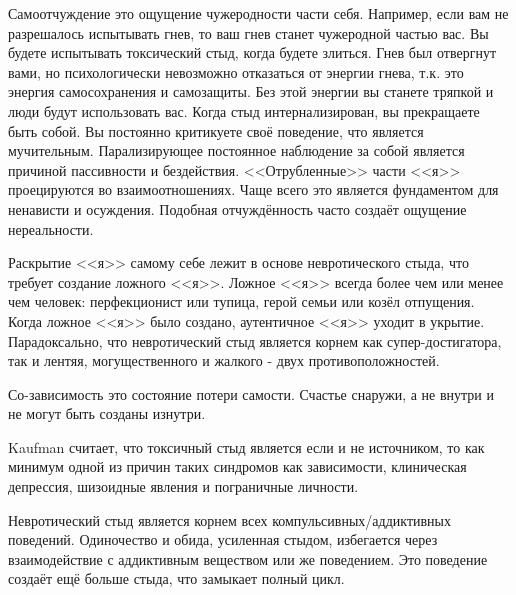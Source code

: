 \documentclass[10pt, fleqn]{article}
\begin{document}

Самоотчуждение это ощущение чужеродности части себя. Например, если вам не разрешалось испытывать гнев, то ваш гнев станет чужеродной частью вас. Вы будете испытывать токсический стыд, когда будете злиться. Гнев был отвергнут вами, но психологически невозможно отказаться от энергии гнева, т.к. это энергия самосохранения и самозащиты. Без этой энергии вы станете тряпкой и люди будут использовать вас.
Когда стыд интернализирован, вы прекращаете быть собой. Вы постоянно критикуете своё поведение, что является мучительным. Парализирующее постоянное наблюдение за собой является причиной пассивности и бездействия.
<<Отрубленные>> части <<я>> проецируются во взаимоотношениях. Чаще всего это является фундаментом для ненависти и осуждения.
Подобная отчуждённость часто создаёт ощущение нереальности.


Раскрытие <<я>> самому себе лежит в основе невротического стыда, что требует создание ложного <<я>>. Ложное <<я>> всегда более чем или менее чем человек: перфекционист или тупица, герой семьи или козёл отпущения. Когда ложное <<я>> было создано, аутентичное <<я>> уходит в укрытие.
Парадоксально, что невротический стыд является корнем как супер-достигатора, так и лентяя, могущественного и жалкого - двух противоположностей.


Со-зависимость это состояние потери самости. Счастье снаружи, а не внутри и не могут быть созданы изнутри.


Kaufman считает, что токсичный стыд является если и не источником, то как минимум одной из причин таких синдромов как зависимости, клиническая депрессия, шизоидные явления и пограничные личности.


Невротический стыд является корнем всех компульсивных/аддиктивных поведений.
Одиночество и обида, усиленная стыдом, избегается через взаимодействие с аддиктивным веществом или же поведением. Это поведение создаёт ещё больше стыда, что замыкает полный цикл.

\end{document}
